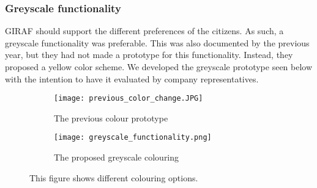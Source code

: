 \subsubsection{Greyscale functionality}
GIRAF should support the different preferences of the citizens. 
As such, a greyscale functionality was preferable.
This was also documented by the previous year, but they had not made a prototype for this functionality.
Instead, they proposed a yellow color scheme.
We developed the greyscale prototype seen below with the intention to have it evaluated by company representatives.
\begin{figure}[H]
    \begin{subfigure}{0.5\textwidth}
    \texttt{[image: previous\_color\_change.JPG]} 
    \caption{The previous colour prototype}
    \label{fig:previous_greyscale_prototype}
    \end{subfigure}
    \begin{subfigure}{0.5\textwidth}
        \texttt{[image: greyscale\_functionality.png]}
    \caption{The proposed greyscale colouring}
    \label{fig:new_greyscale_prototype}
    \end{subfigure} 
    \caption{This figure shows different colouring options.}
    \label{fig:greyscale_prototype}
\end{figure}



